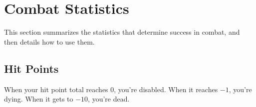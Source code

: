 \section{Combat Statistics}
This section summarizes the statistics that determine success in combat, and then details how to use them.






\subsection{Hit Points}
When your hit point total reaches 0, you're disabled. When it reaches $-1$, you're dying. When it gets to $-10$, you're dead.



